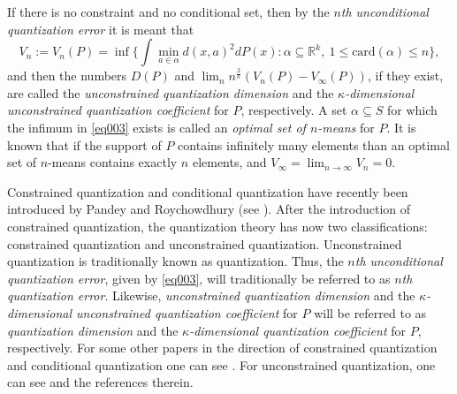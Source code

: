 \documentclass[12pt, reqno]{amsart}
\theoremstyle{plain}
\theoremstyle{definition}
\newcommand{\ci}{\subseteq}%
\newcommand{\ga}{\alpha}
\newcommand{\gk}{\kappa}
\newcommand{\tit}{\textit}%
\newcommand{\D}[1]{\mathbb{#1}}%
\begin{document}
\par 
If there is no constraint and no conditional set, then by the \tit{$n$th unconditional quantization error} it is meant that 
\begin{equation} \label{eq003}
V_{n}:=V_{n}(P)=\inf \Big\{\int \mathop{\min}\limits_{a\in\ga} d(x, a)^2 dP(x) : \ga \ci \D R^k, ~ 1\leq  \text{card}(\ga) \leq n \Big\},
\end{equation}
and then the numbers $D(P)$ and $\lim_n  n^{\frac 2 \gk}(V_n(P)-V_\infty(P))$, if they exist, are called the \tit{unconstrained quantization dimension} and the \tit{$\gk$-dimensional unconstrained quantization coefficient} for $P$, respectively. A set $\ga\ci S$ for which the infimum in \eqref{eq003} exists is called an \tit{optimal set of $n$-means} for $P$. It is known that if the support of $P$ contains infinitely many elements than an optimal set of $n$-means contains exactly $n$ elements, and $V_\infty=\lim_{n\to \infty} V_n=0$.
\par
Constrained quantization and conditional quantization have recently been introduced by Pandey and Roychowdhury (see \cite{PR1, PR4}). After the introduction of constrained quantization, the quantization theory has now two classifications: constrained quantization and unconstrained quantization. Unconstrained quantization is traditionally known as quantization. Thus, the \tit{$n$th unconditional quantization error}, given by \eqref{eq003}, will traditionally be referred to as \tit{$n$th quantization error}. Likewise, \tit{unconstrained quantization dimension} and the \tit{$\gk$-dimensional unconstrained quantization coefficient} for $P$ will be referred to as \tit{quantization dimension} and the \tit{$\gk$-dimensional quantization coefficient} for $P$, respectively. For some other papers in the direction of constrained quantization and conditional quantization one can see \cite{BCDRV,BCDR,HNPR,PR3}. For unconstrained quantization, one can see \cite{ DFG, GG, GL2, GL3, GL, GN, GL1,  KNZ, P, P1, Z1, Z2} and the references therein. 
\par 
\end{document}
